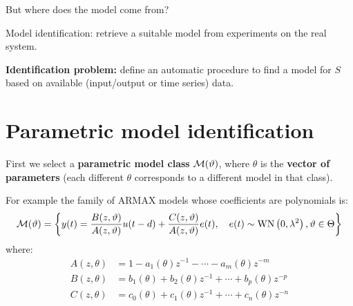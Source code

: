 But where does the model come from?

Model identification: retrieve a suitable model from experiments on the real system.


\textbf{Identification problem:} define an automatic procedure to find a model for $S$ based on available (input/output or time series) data.





\section{Parametric model identification}

First we select a \textbf{parametric model class} $\mathcal{M}(\vartheta)$, where $\theta$ is the \textbf{vector of parameters} (each different $\theta$ corresponds to a different model in that class).

For example the family of ARMAX models whose coefficients are polynomials is:
$$
	\mathcal{M}(\vartheta)=\left\{y(t)=\frac{B(z, \vartheta)}{A(z, \vartheta)} u(t-d)+\frac{C(z, \vartheta)}{A(z, \vartheta)} e(t), \quad e(t) \sim \operatorname{WN}\left(0, \lambda^{2}\right), \vartheta\in\Theta\right\}
$$
where:
\begin{align*}
	A(z, \theta)&=1-a_{1}(\theta) z^{-1}-\cdots-a_{m}(\theta) z^{-m} \\
	B(z, \theta)&=b_{1}(\theta)+b_{2}(\theta) z^{-1}+\cdots+b_{p}(\theta) z^{-p}\\
	C(z, \theta)&=c_0(\theta)+c_{1}(\theta) z^{-1}+\cdots+c_{n}(\theta) z^{-n}
\end{align*}

